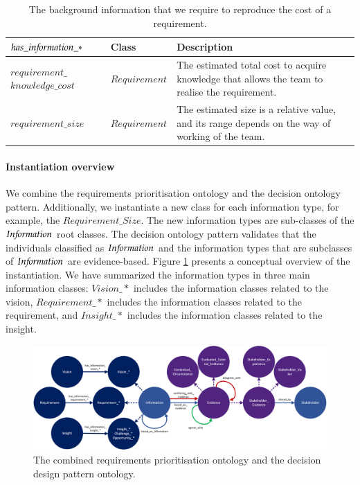 \begin{table}[H]
\centering
\caption{The background information that we require to reproduce the cost of a requirement.}
\begin{tabular}{| p{3cm} | p{2.5cm} | p{9.5cm} | }
\hline
\rowcolor{document}
\color{documentText}$has\_in{\mkern-2mu f\mkern-3mu}ormation\_*$ & \color{documentText}Class & \color{documentText}Description  \\
\hline
$requirement\_$ $knowledge\_cost$ & $Requirement$ & The estimated total cost to acquire knowledge that allows the team to realise the requirement. \\ 
\hdashline
$requirement\_size$ & $Requirement$ & The estimated size is a relative value, and its range depends on the way of working of the team. \\ 
\hline
\end{tabular}
\label{table:rpp_requirement_confidence}
\end{table}

\paragraph{Instantiation overview}
We combine the requirements prioritisation ontology and the decision ontology pattern. Additionally, we instantiate a new class for each information type, for example, the $Requirement\_Size$. The new information types are sub-classes of the $In{\mkern-2mu f\mkern-3mu}ormation$ root classes. The decision ontology pattern validates that the individuals classified as $In{\mkern-2mu f\mkern-3mu}ormation$ and the information types that are subclasses of $In{\mkern-2mu f\mkern-3mu}ormation$ are evidence-based. Figure \ref{fig:05_RP_Instantiated} presents a conceptual overview of the instantiation. We have summarized the information types in three main information classes: $Vision\_*$ includes the information classes related to the vision, $Requirement\_*$ includes the information classes related to the requirement, and $Insight\_*$ includes the information classes related to the insight. 

\begin{figure}[H]
\centering
  \includegraphics[width=17cm]{../../Images/05_Validation/05_RP_Instantiated.png}
  \caption{The combined requirements prioritisation ontology and the decision design pattern ontology.}
  \label{fig:05_RP_Instantiated}
\end{figure}

